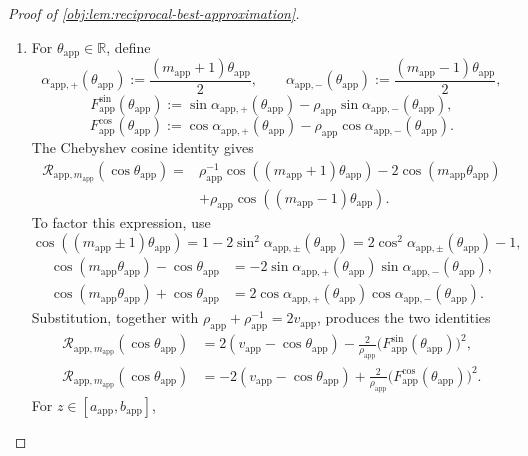 \documentclass[11pt]{article}
\begin{document}
\begin{proof}[Proof of \cref{obj:lem:reciprocal-best-approximation}]
\begin{enumerate}
\item For \(\theta_{\mathrm{app}}\in\mathbb R\), define
\[
\alpha_{\mathrm{app},+}(\theta_{\mathrm{app}})
:=\frac{(m_{\mathrm{app}}+1)\theta_{\mathrm{app}}}{2},
\qquad
\alpha_{\mathrm{app},-}(\theta_{\mathrm{app}})
:=\frac{(m_{\mathrm{app}}-1)\theta_{\mathrm{app}}}{2},
\]
\[
F_{\mathrm{app}}^{\sin}(\theta_{\mathrm{app}})
:=
\sin\alpha_{\mathrm{app},+}(\theta_{\mathrm{app}})
-\rho_{\mathrm{app}}
\sin\alpha_{\mathrm{app},-}(\theta_{\mathrm{app}}),
\]
\[
F_{\mathrm{app}}^{\cos}(\theta_{\mathrm{app}})
:=
\cos\alpha_{\mathrm{app},+}(\theta_{\mathrm{app}})
-\rho_{\mathrm{app}}
\cos\alpha_{\mathrm{app},-}(\theta_{\mathrm{app}}).
\]
The Chebyshev cosine identity gives
\[
\begin{aligned}
\mathcal R_{\mathrm{app},m_{\mathrm{app}}}
(\cos\theta_{\mathrm{app}})
={}&
\rho_{\mathrm{app}}^{-1}
\cos((m_{\mathrm{app}}+1)\theta_{\mathrm{app}})
-2\cos(m_{\mathrm{app}}\theta_{\mathrm{app}})\\
&+\rho_{\mathrm{app}}
\cos((m_{\mathrm{app}}-1)\theta_{\mathrm{app}}).
\end{aligned}
\]
To factor this expression, use
\[
\cos((m_{\mathrm{app}}\pm1)\theta_{\mathrm{app}})
=
1-2\sin^2\alpha_{\mathrm{app},\pm}(\theta_{\mathrm{app}})
=
2\cos^2\alpha_{\mathrm{app},\pm}(\theta_{\mathrm{app}})-1,
\]
\[
\begin{aligned}
\cos(m_{\mathrm{app}}\theta_{\mathrm{app}})
-\cos\theta_{\mathrm{app}}
&=-2\sin\alpha_{\mathrm{app},+}(\theta_{\mathrm{app}})
\sin\alpha_{\mathrm{app},-}(\theta_{\mathrm{app}}),\\
\cos(m_{\mathrm{app}}\theta_{\mathrm{app}})
+\cos\theta_{\mathrm{app}}
&=2\cos\alpha_{\mathrm{app},+}(\theta_{\mathrm{app}})
\cos\alpha_{\mathrm{app},-}(\theta_{\mathrm{app}}).
\end{aligned}
\]
Substitution, together with
\(\rho_{\mathrm{app}}+\rho_{\mathrm{app}}^{-1}
=2v_{\mathrm{app}}\), produces the two identities
\[
\begin{aligned}
\mathcal R_{\mathrm{app},m_{\mathrm{app}}}
(\cos\theta_{\mathrm{app}})
&=
2(v_{\mathrm{app}}-\cos\theta_{\mathrm{app}})
-\frac{2}{\rho_{\mathrm{app}}}
\bigl(F_{\mathrm{app}}^{\sin}(\theta_{\mathrm{app}})\bigr)^2,\\
\mathcal R_{\mathrm{app},m_{\mathrm{app}}}
(\cos\theta_{\mathrm{app}})
&=
-2(v_{\mathrm{app}}-\cos\theta_{\mathrm{app}})
+\frac{2}{\rho_{\mathrm{app}}}
\bigl(F_{\mathrm{app}}^{\cos}(\theta_{\mathrm{app}})\bigr)^2.
\end{aligned}
\]
For \(z\in[a_{\mathrm{app}},b_{\mathrm{app}}]\),

\end{enumerate}
\end{proof}
\end{document}
